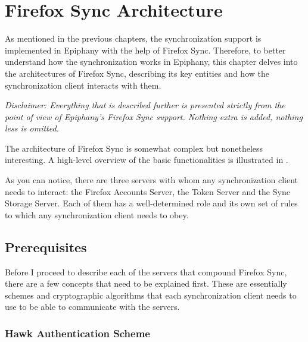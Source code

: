 \chapter{Firefox Sync Architecture}
\label{chapter:firefox-sync-architecture}

As mentioned in the previous chapters, the synchronization support is implemented in Epiphany with the help of Firefox Sync. Therefore, to better understand how the synchronization works in Epiphany, this chapter delves into the architectures of Firefox Sync, describing its key entities and how the synchronization client interacts with them.

\textit{Disclaimer: Everything that is described further is presented strictly from the point of view of Epiphany's Firefox Sync support. Nothing extra is added, nothing less is omitted.}

The architecture of Firefox Sync is somewhat complex but nonetheless interesting. A high-level overview of the basic functionalities is illustrated in .


As you can notice, there are three servers with whom any synchronization client needs to interact: the Firefox Accounts Server, the Token Server and the Sync Storage Server. Each of them has a well-determined role and its own set of rules to which any synchronization client needs to obey.

\section{Prerequisites}
\label{sec:prerequisites}

Before I proceed to describe each of the servers that compound Firefox Sync, there are a few concepts that need to be explained first. These are essentially schemes and cryptographic algorithms that each synchronization client needs to use to be able to communicate with the servers.

\subsection{Hawk Authentication Scheme}
\label{sub-sec:hawk}

